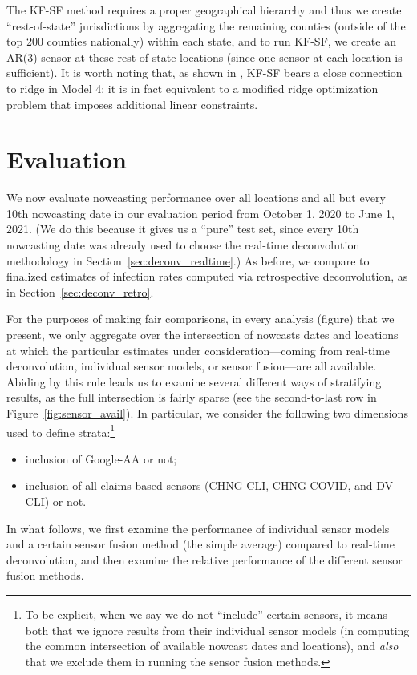 \documentclass[sts]{imsart}
\theoremstyle{plain}
\theoremstyle{definition}
\theoremstyle{remark}
\begin{document}
The KF-SF method requires a proper geographical hierarchy and thus we create
``rest-of-state'' jurisdictions by aggregating the remaining counties (outside
of the top 200 counties nationally) within each state, and to run KF-SF, we
create an AR(3) sensor at these rest-of-state locations (since one sensor at
each location is sufficient). It is worth noting that, as shown in
\citet{Jahja:2019}, KF-SF bears a close connection to ridge in Model 4: it 
is in fact equivalent to a modified ridge optimization problem that imposes
additional linear constraints. 

\section{Evaluation}
\label{sec:evaluation}

We now evaluate nowcasting performance over all locations and all but every 10th
nowcasting date in our evaluation period from October 1, 2020 to June 1,
2021. (We do this because it gives us a ``pure'' test set, since every 10th
nowcasting date was already used to choose the real-time deconvolution
methodology in Section~\ref{sec:deconv_realtime}.) As before, we compare to
finalized estimates of infection rates computed via retrospective deconvolution,
as in Section~\ref{sec:deconv_retro}. 

For the purposes of making fair comparisons, in every analysis (figure) that we
present, we only aggregate over the intersection of nowcasts dates and locations
at which the particular estimates under consideration---coming from real-time 
deconvolution, individual sensor models, or sensor fusion---are all
available. Abiding by this rule leads us to examine several different ways of
stratifying results, as the full intersection is fairly sparse (see the
second-to-last row in Figure~\ref{fig:sensor_avail}). In particular, we
consider the following two dimensions used to define strata:\footnote{To be
  explicit, when we say we do not ``include'' certain sensors, it means both 
  that we ignore results from their individual sensor models (in computing the
  common intersection of available nowcast dates and locations), and \emph{also}
  that we exclude them in running the sensor fusion methods.}  
\begin{itemize}
\item inclusion of Google-AA or not; 
\item inclusion of all claims-based sensors (CHNG-CLI, CHNG-COVID, and DV-CLI)
  or not. 
\end{itemize}
In what follows, we first examine the performance of individual sensor models
and a certain sensor fusion method (the simple average) compared to real-time
deconvolution, and then examine the relative performance of the different sensor
fusion methods.  
\end{document}

